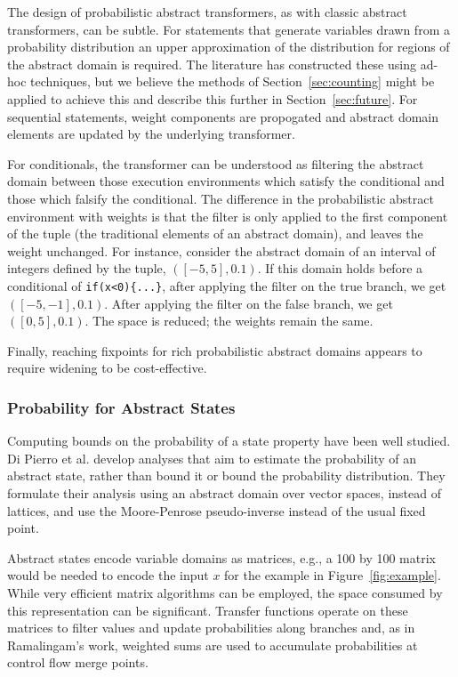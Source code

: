 The design of probabilistic abstract transformers, as with 
classic abstract transformers, can be subtle.
For statements that generate variables drawn from a probability
distribution an upper approximation of the distribution for
regions of the abstract domain is required.  The literature
has constructed these using ad-hoc techniques, but we believe
the methods of Section~\ref{sec:counting} might be applied to 
achieve this and describe this further in Section~\ref{sec:future}.
For sequential statements, weight components are propogated
and abstract domain elements are updated by the underlying transformer.

For conditionals, the transformer can be understood
as filtering the abstract domain between those execution environments which
satisfy the conditional and those which falsify the conditional. 
The difference in the probabilistic abstract environment with weights 
is that the filter is only applied to the first component of
the tuple (the traditional elements of an abstract domain), 
and leaves the weight unchanged.
For instance, consider the abstract domain of an interval of 
integers defined by the tuple, $([-5,5],0.1)$. 
If this domain holds before a conditional of 
{\tt if(x<0)\{...\}}, after applying the filter on the true branch, 
we get $([-5,-1],0.1)$. 
After applying the filter on the false branch, we get $([0,5],0.1)$.
The space is reduced; the weights remain the same.

Finally, reaching fixpoints for rich probabilistic abstract domains
appears to require widening \cite{monniaux2000abstract,esparza2011probabilistic} to be cost-effective.

\subsubsection{Probability for Abstract States}

Computing bounds on the probability of a state property have been well studied.
Di Pierro et al. \cite{di2013probabilistic} develop analyses
that aim to estimate the probability of an abstract state, 
rather than bound it or bound the probability distribution.  
They formulate their analysis using an abstract 
domain over vector spaces, instead of lattices, and use
the Moore-Penrose pseudo-inverse instead of the usual fixed point.

Abstract states encode variable domains as matrices, e.g., a 100 by 100 matrix
would be needed to encode the input $x$ for the example in 
Figure~\ref{fig:example}.  While very efficient matrix algorithms
can be employed, the space consumed by this representation can
be significant.  
Transfer functions operate on these matrices to filter values and
update probabilities along branches and, 
as in Ramalingam's work, weighted sums are used to accumulate probabilities
at control flow merge points.

